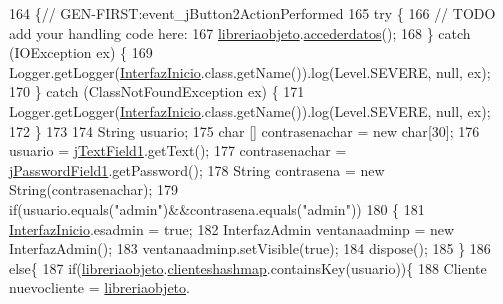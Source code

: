 \begin{DoxyCode}
164                                                                          \{\textcolor{comment}{//
      GEN-FIRST:event\_jButton2ActionPerformed}
165         \textcolor{keywordflow}{try} \{
166             \textcolor{comment}{// TODO add your handling code here:}
167             \mbox{\hyperlink{class_interfaz_package_1_1_interfaz_inicio_adccd9cfdf4551ca7ae66b2c9caffa049}{libreriaobjeto}}.\mbox{\hyperlink{classlibreria_1_1_libreria_a0ebf81d2e66a26a82de5b997aae37065}{accederdatos}}();
168         \} \textcolor{keywordflow}{catch} (IOException ex) \{
169             Logger.getLogger(\mbox{\hyperlink{class_interfaz_package_1_1_interfaz_inicio_ab0f2775716e858910156769284c39718}{InterfazInicio}}.class.getName()).log(Level.SEVERE, null, ex);
170         \} \textcolor{keywordflow}{catch} (ClassNotFoundException ex) \{
171             Logger.getLogger(\mbox{\hyperlink{class_interfaz_package_1_1_interfaz_inicio_ab0f2775716e858910156769284c39718}{InterfazInicio}}.class.getName()).log(Level.SEVERE, null, ex);
172         \}
173         
174         String usuario;
175         \textcolor{keywordtype}{char} [] contrasenachar = \textcolor{keyword}{new} \textcolor{keywordtype}{char}[30];
176         usuario = \mbox{\hyperlink{class_interfaz_package_1_1_interfaz_inicio_a6c0a79d5c225c996fd8e03141682afe7}{jTextField1}}.getText();
177         contrasenachar = \mbox{\hyperlink{class_interfaz_package_1_1_interfaz_inicio_a8fde0bb0a462417298eaf6468976a838}{jPasswordField1}}.getPassword();
178         String contrasena = \textcolor{keyword}{new} String(contrasenachar);
179         \textcolor{keywordflow}{if}(usuario.equals(\textcolor{stringliteral}{"admin"})&&contrasena.equals(\textcolor{stringliteral}{"admin"}))
180         \{
181             \mbox{\hyperlink{class_interfaz_package_1_1_interfaz_inicio_ab0f2775716e858910156769284c39718}{InterfazInicio}}.esadmin = \textcolor{keyword}{true};
182             InterfazAdmin ventanaadminp = \textcolor{keyword}{new} InterfazAdmin();
183             ventanaadminp.setVisible(\textcolor{keyword}{true});
184             dispose();
185         \}
186         \textcolor{keywordflow}{else}\{
187             \textcolor{keywordflow}{if}(\mbox{\hyperlink{class_interfaz_package_1_1_interfaz_inicio_adccd9cfdf4551ca7ae66b2c9caffa049}{libreriaobjeto}}.\mbox{\hyperlink{classlibreria_1_1_libreria_a9bb86627af6c43f97367c8a28d9f0d3e}{clienteshashmap}}.containsKey(usuario))\{
188                 Cliente nuevocliente = \mbox{\hyperlink{class_interfaz_package_1_1_interfaz_inicio_adccd9cfdf4551ca7ae66b2c9caffa049}{libreriaobjeto}}.

\end{DoxyCode}

